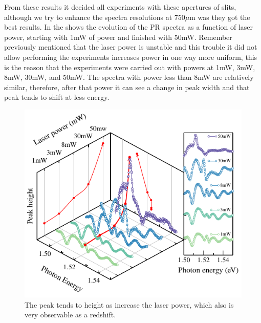From these results it decided all experiments with these apertures of slits, although we  try to enhance the spectra resolutions at 750$\mu$m was they got the best results. In the   shows the evolution of the PR spectra as a function of laser power, starting with 1mW of power and finished with 50mW. Remember previously mentioned that the laser power is unstable and this trouble it did not allow performing  the experiments increases power in one way more uniform, this is the reason that the experiments were carried out with powers at 1mW, 3mW, 8mW, 30mW, and 50mW.  The spectra with power less than 8mW are relatively similar, therefore,  after that power it can see a change in peak width and that peak tends to shift at less energy. \\
\begin{figure}[ht!]
	\centering
	\includegraphics[width=\textwidth]{../figures/chapter-3/pr-plots/build/pr-set6.pdf}
	\caption{The peak tends to height as increase the laser power, which also is very observable as a redshift. }
	\label{fig:chapter-3-pr-plot-set6}
\end{figure}

